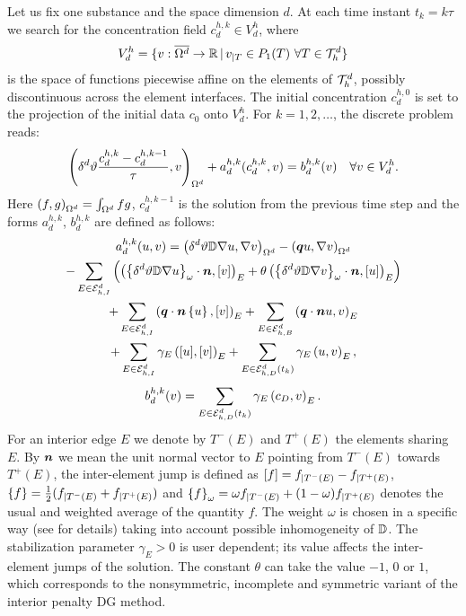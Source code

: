 Let us fix one substance and the space dimension $d$.
At each time instant $t_k=k\tau$ we search for the concentration field $c_d^{h,k}\in V_d^h$, where
$$ V_d^h = \{v:\overline{\Omega^d}\to\R\where v_{|T}\in P_1(T)~\forall T\in\Th^d\} $$
is the space of functions piecewise affine on the elements of $\Th^d$, possibly discontinuous across the element interfaces.
The initial concentration $c^{h,0}_d$ is set to the projection of the initial data $c_0$ onto $V_d^h$.
For $k=1,2,\ldots$, the discrete problem reads:
\begin{equation*}
\sc{\delta^d\th\frac{c_d^{h,k}-c^{h,k-1}_d}\tau}{v}_{\Omega^d} + a^{h,k}_d(c^{h,k}_d,v) = b^{h,k}_d(v) \quad \forall v\in V^h_d.
\end{equation*}
Here $\sc{f}{g}_{\Omega^d}=\int_{\Omega^d} f g$, $c^{h,k-1}_d$ is the solution from the previous time step and the forms $a^{h,k}_d$, $b^{h,k}_d$ are defined as follows:
\begin{multline*}
a^{h,k}_d(u,v) = \sc{\delta^d\th\D\nabla u}{\nabla v}_{\Omega^d}
- \sc{\vc q u}{\nabla v}_{\Omega^d}\\
- \sum_{E\in\Ehint^d}\left(\sc{\wavg{\delta^d\th\D\nabla u}\cdot\n}{\jmp{v}}_E + \theta\sc{\wavg{\delta^d\th\D\nabla v}\cdot\n}{\jmp{u}}_E\right)\\
+ \sum_{E\in\Ehint^d}\sc{\vc q\cdot\n\avg{u}}{\jmp{v}}_E
+ \sum_{E\in\Ehb^d}\sc{\vc q\cdot\n u}{v}_E \\
+ \sum_{E\in\Ehint^d}\gamma_E\sc{\jmp{u}}{\jmp{v}}_E
+ \sum_{E\in\Ehdir^d(t_k)}\gamma_E\sc{u}{v}_E,
\end{multline*}
% 
\begin{equation*}
b^{h,k}_d(v) = \sum_{E\in\Ehdir^d(t_k)}\gamma_E\sc{c_D}{v}_E.
\end{equation*}
For an interior edge $E$ we denote by $T^-(E)$ and $T^+(E)$ the elements sharing $E$.
By $\n$ we mean the unit normal vector to $E$ pointing from $T^-(E)$ towards $T^+(E)$, the inter-element jump is defined as $\jmp{f}=f_{|T^-(E)}-f_{|T^+(E)}$, $\avg{f}=\frac12(f_{|T^-(E)} + f_{|T^+(E)})$ and $\wavg{f}=\omega f_{|T^-(E)} + (1-\omega) f_{|T^+(E)}$ denotes the usual and weighted average of the quantity $f$.
The weight $\omega$ is chosen in a specific way (see \cite{ern_stephansen_zunino} for details) taking into account possible inhomogeneity of $\D$.
The stabilization parameter $\gamma_E>0$ is user dependent; its value affects the inter-element jumps of the solution.
The constant $\theta$ can take the value $-1$, $0$ or $1$, which corresponds to the nonsymmetric, incomplete and symmetric variant of the interior penalty DG method.

